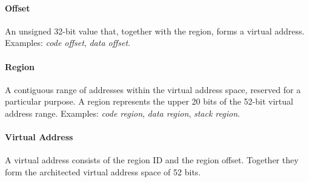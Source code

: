 \paragraph{Offset}
An unsigned 32-bit value that, together with the region, forms a virtual address.  
Examples: \textit{code offset}, \textit{data offset}.

\paragraph{Region}
A contiguous range of addresses within the virtual address space, reserved for a particular purpose. A region represents the upper 20 bits of the 52-bit virtual address range. 
Examples: \textit{code region}, \textit{data region}, \textit{stack region}.

\paragraph{Virtual Address}
A virtual address consists of the region ID and the region offset. Together they form the architected virtual address space of 52 bits.
